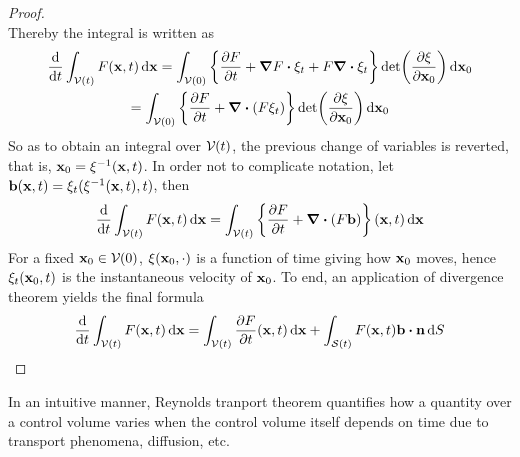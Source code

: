 \begin{proof}
\begin{equation*}
	\end{equation*}
	Thereby the integral is written as
	\begin{multline*}
		\frac{\dd}{\dd{t}} \int_{\cv{}(t)} F(\vb{x}, t) \dd{\vb{x}} = 
		\int_{\cv{}(0)} 
		\left\{
		\frac{\partial F}{\partial t} + \grad{F} \vdot \xi_t + F \div{\xi_t}
		\right\} \det(\frac{\partial \xi}{\partial \vb{x}_0}) \dd{\vb{x}_0} 
		\\ = 
		\int_{\cv{}(0)} 
		\left\{	\frac{\partial F}{\partial t} + \div(F \xi_t) \right\} \det(\frac{\partial \xi}{\partial \vb{x}_0}) \dd{\vb{x}_0}
	\end{multline*}
	So as to obtain an integral over $\mathcal{V}_{}(t)$, the previous change of variables is reverted, that is, $\vb{x}_0 = \xi^{-1}(\vb{x}, t)$. In order not to complicate notation, let $\vb{b}(\vb{x},t) = \xi_t(\xi^{-1}(\vb{x},t),t)$, then
	\begin{equation*}
		\frac{\dd}{\dd{t}} \int_{\mathcal{V}_{}(t)} F(\vb{x}, t) \dd{\vb{x}} = 
		\int_{\mathcal{V}_{}(t)} 
		\left\{ \frac{\partial F}{\partial t}  + \div(F \vb{b}) \right\} (\vb{x}, t) \dd{\vb{x}}
	\end{equation*}
	For a fixed $\vb{x}_0 \in \mathcal{V}_{}(0)$, $\xi(\vb{x}_0, \cdot)$ is a function of time giving how $\vb{x}_0$ moves, hence $\xi_t(\vb{x}_0, t)$ is the instantaneous velocity of $\vb{x}_0$. To end, an application of divergence theorem yields the final formula
	\begin{equation*}
		\frac{\dd}{\dd{t}} \int_{\cv{}(t)} F(\vb{x}, t) \dd{\vb{x}} = 
		\int_{\cv{}(t)} \frac{\partial F}{\partial t} (\vb{x}, t) \dd{\vb{x}} +
		\int_{\cs{}(t)} F(\vb{x}, t) \vb{b} \vdot \vb{n} \dd{S}
	\end{equation*}
\end{proof}

In an intuitive manner, Reynolds tranport theorem quantifies how a quantity over a control volume varies when the control volume itself depends on time due to transport phenomena, diffusion, etc. 






